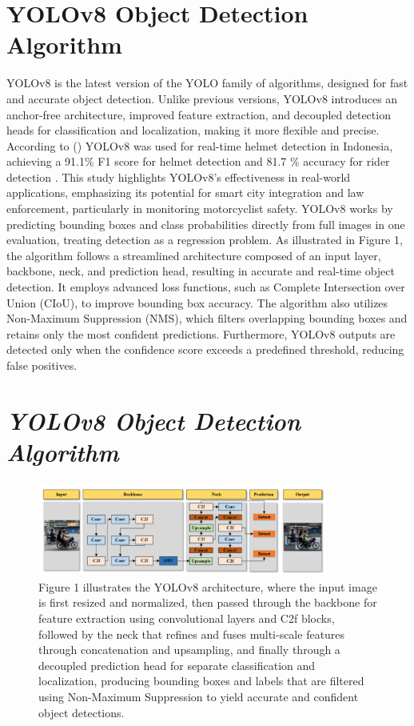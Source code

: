 \begin{refsection}
\section*{ YOLOv8 Object Detection Algorithm}

YOLOv8 is the latest version of the YOLO family of algorithms, designed for fast and accurate object detection. Unlike previous versions, YOLOv8 introduces an anchor-free architecture, improved feature extraction, and decoupled detection heads for classification and localization, making it more flexible and precise. According to \citeauthor{Muhammad2024} (\citeyear{Muhammad2024}) YOLOv8 was used for real-time helmet detection in Indonesia, achieving a 91.1\% F1 score for helmet detection and 81.7 \% accuracy for rider detection \cite{Muhammad2024}. This study highlights YOLOv8's effectiveness in real-world applications, emphasizing its potential for smart city integration and law enforcement, particularly in monitoring motorcyclist safety.
YOLOv8 works by predicting bounding boxes and class probabilities directly from full images in one evaluation, treating detection as a regression problem. As illustrated in Figure 1, the algorithm follows a streamlined architecture composed of an input layer, backbone, neck, and prediction head, resulting in accurate and real-time object detection. It employs advanced loss functions, such as Complete Intersection over Union (CIoU), to improve bounding box accuracy. The algorithm also utilizes Non-Maximum Suppression (NMS), which filters overlapping bounding boxes and retains only the most confident predictions. Furthermore, YOLOv8 outputs are detected only when the confidence score exceeds a predefined threshold, reducing false positives. 

\section*{\textbf{\textit{ YOLOv8 Object Detection Algorithm}}}
\begin{figure}[ht]
    \centering
	\includegraphics[width=0.85\textwidth]{figures/Fig 1.png} 
	\caption[ Yolov8 Object Detection Architecture]{Figure 1 illustrates the YOLOv8 architecture, where the input image is first resized and normalized, then passed through the backbone for feature extraction using convolutional layers and C2f blocks, followed by the neck that refines and fuses multi-scale features through concatenation and upsampling, and finally through a decoupled prediction head for separate classification and localization, producing bounding boxes and labels that are filtered using Non-Maximum Suppression to yield accurate and confident object detections.}
	\label{fig:firstFig}
\end{figure}


\end{refsection}
